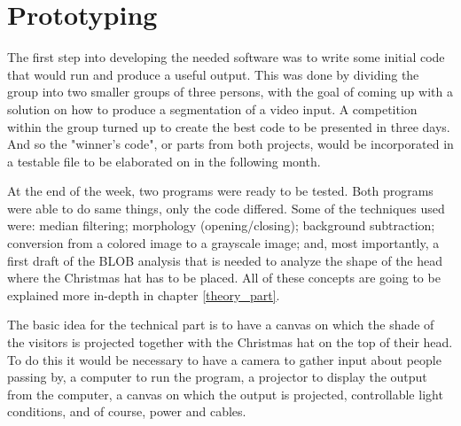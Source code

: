 
\section{Prototyping}
The first step into developing the needed software was to write some initial code that would run and produce a useful output. This was done by dividing the group into two smaller groups of three persons, with the goal of coming up with a solution on how to produce a segmentation of a video input. A competition within the group turned up to create the best code to be presented in three days. And so the "winner's code", or parts from both projects, would be incorporated in a testable file to be elaborated on in the following month.

At the end of the week, two programs were ready to be tested. Both programs were able to do same things, only the code differed. Some of the techniques used were: median filtering; morphology (opening/closing); background subtraction; conversion from a colored image to a grayscale image; and, most importantly, a first draft of the BLOB analysis that is needed to analyze the shape of the head where the Christmas hat has to be placed. All of these concepts are going to be explained more in-depth in chapter \ref{theory_part}.

The basic idea for the technical part is to have a canvas on which the shade of the visitors is projected together with the Christmas hat on the top of their head. To do this it would be necessary to have a camera to gather input about people passing by, a computer to run the program, a projector to display the output from the computer, a canvas on which the output is projected, controllable light conditions, and of course, power and cables.


